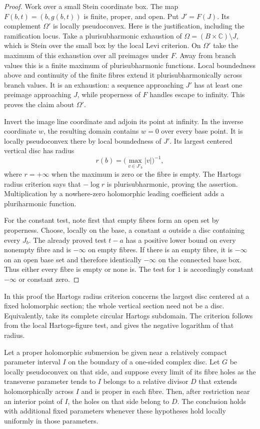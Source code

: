 \begin{proof}
Work over a small Stein coordinate box. The map $F(b,t)=(b,g(b,t))$ is finite, proper, and open. Put $J'=F(J)$. Its complement $\Omega'$ is locally pseudoconvex. Here is the justification, including the ramification locus. Take a plurisubharmonic exhaustion of $\Omega=(B\times\mathbb{C})\setminus J$, which is Stein over the small box by the local Levi criterion. On $\Omega'$ take the maximum of this exhaustion over all preimages under $F$. Away from branch values this is a finite maximum of plurisubharmonic functions. Local boundedness above and continuity of the finite fibres extend it plurisubharmonically across branch values. It is an exhaustion: a sequence approaching $J'$ has at least one preimage approaching $J$, while properness of $F$ handles escape to infinity. This proves the claim about $\Omega'$.

Invert the image line coordinate and adjoin its point at infinity. In the inverse coordinate $w$, the resulting domain contains $w=0$ over every base point. It is locally pseudoconvex there by local boundedness of $J'$. Its largest centered vertical disc has radius
\[
 r(b)=\bigl(\max_{v\in J'_b}|v|\bigr)^{-1},
\]
where $r=+\infty$ when the maximum is zero or the fibre is empty. The Hartogs radius criterion says that $-\log r$ is plurisubharmonic, proving the assertion. Multiplication by a nowhere-zero holomorphic leading coefficient adds a pluriharmonic function.

For the constant test, note first that empty fibres form an open set by properness. Choose, locally on the base, a constant $a$ outside a disc containing every $J_b$. The already proved test $t-a$ has a positive lower bound on every nonempty fibre and is $-\infty$ on empty fibres. If there is an empty fibre, it is $-\infty$ on an open base set and therefore identically $-\infty$ on the connected base box. Thus either every fibre is empty or none is. The test for $1$ is accordingly constant $-\infty$ or constant zero.
\end{proof}

In this proof the Hartogs radius criterion concerns the largest disc centered at a fixed holomorphic section; the whole vertical section need not be a disc. Equivalently, take its complete circular Hartogs subdomain. The criterion follows from the local Hartogs-figure test, and gives the negative logarithm of that radius.

\begin{lemma}\label{lem:holes-boundary-trapping}
Let a proper holomorphic submersion be given near a relatively compact parameter interval $I$ on the boundary of a one-sided complex disc. Let $G$ be locally pseudoconvex on that side, and suppose every limit of its fibre holes as the transverse parameter tends to $I$ belongs to a relative divisor $D$ that extends holomorphically across $I$ and is proper in each fibre. Then, after restriction near an interior point of $I$, the holes on that side belong to $D$. The conclusion holds with additional fixed parameters whenever these hypotheses hold locally uniformly in those parameters.
\end{lemma}

